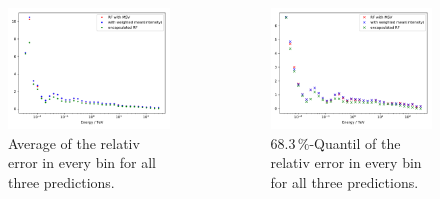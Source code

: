 \documentclass[aspectratio=1610, professionalfonts, 9pt]{beamer}
\begin{document}
  \begin{frame}
    \begin{columns}
      \begin{column}{0.5\textwidth}
        \begin{figure}
          \centering
          \includegraphics[width=\textwidth]{Plots/RF_MSV_rel_mean.pdf}
          \caption{Average of the relativ error in every bin for all three predictions.}
        \end{figure}
      \end{column}
      \begin{column}{0.5\textwidth}
        \begin{figure}
          \centering
          \includegraphics[width=\textwidth]{Plots/RF_MSV_rel_std.pdf}
          \caption{$68.3\,\%$-Quantil of the relativ error in every bin for all three predictions.}
        \end{figure}
      \end{column}
    \end{columns}
  \end{frame}
\end{document}
